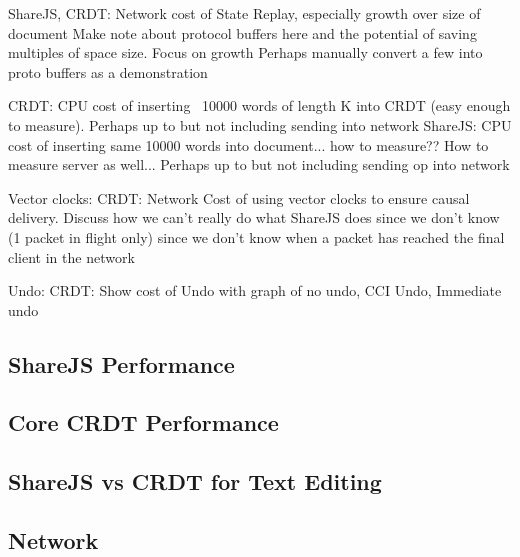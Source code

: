 \documentclass[12pt,a4paper,twoside,openright]{report}
\begin{document}
			ShareJS, CRDT: Network cost of State Replay, especially growth over size of document
							Make note about protocol buffers here and the potential of saving multiples of space size. Focus on growth	
							Perhaps manually convert a few into proto buffers as a demonstration
			
			
			CRDT: 	 CPU cost of inserting ~10000 words of length K into CRDT (easy enough to measure). Perhaps up to but not including sending into network
			ShareJS: CPU cost of inserting same 10000 words into document... how to measure?? How to measure server as well...
							Perhaps up to but not including sending op into network
			
			Vector clocks:
				CRDT: Network Cost of using vector clocks to ensure causal delivery. Discuss how we can't really do what ShareJS does since we don't know (1 packet in flight only) since we don't know when a packet has reached the final client in the network
							
			Undo:
				CRDT: Show cost of Undo with graph of no undo, CCI Undo, Immediate undo
				
							
							
			
			
			
	
		\subsection{ShareJS Performance}
		
			\subsubsection{}
		
		\subsection{Core CRDT Performance}
		
		\subsection{ShareJS vs CRDT for Text Editing}
		
		\subsection{Network}
		
		
		
		
		
		
\end{document}
